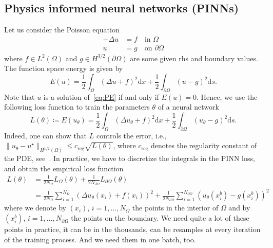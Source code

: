 \documentclass[11pt]{article}
\theoremstyle{definition}
\theoremstyle{plain}
\begin{document}
\subsection{Physics informed neural networks (PINNs)}
Let us consider the Poisson equation %
\begin{align*}\tag{PE}\label{eq:PE}
  -\Delta u & = f \quad \text{in }\Omega \\
  u & = g \quad \text{on }\partial\Omega
\end{align*}
where $f\in L^2(\Omega)$ and $g\in H^{3/2}(\partial\Omega)$ are some given rhs and boundary values.
The function space energy is given by
\[ E(u) = \frac{1}{2} \int_\Omega (\Delta u + f)^2 \mathrm dx + \frac12 \int_{\partial\Omega} (u-g)^2 \mathrm ds. \]
Note that $u$ is a solution of~\eqref{eq:PE} if and only if $E(u)=0$. Hence, we use the following loss function to train the parameters $\theta$ of a neural network
\[ L(\theta) \coloneqq E(u_\theta) = \frac{1}{2} \int_\Omega (\Delta u_\theta + f)^2 \mathrm dx + \frac12 \int_{\partial\Omega} (u_\theta-g)^2 \mathrm ds. \]
Indeed, one can show that $L$ controls the error, i.e., $\lVert u_\theta - u^\star \rVert_{H^{1/2}(\Omega)} \le c_{\operatorname{reg}} \sqrt{L(\theta)}$, where $c_{\operatorname{reg}}$ denotes the regularity constant of the PDE, see~\cite{?}. 
In practice, we have to discretize the integrals in the PINN loss, and obtain the empirical loss function %
\begin{align*}
  L(\theta)
  &=
    \frac{1}{2N_\Omega} L_\Omega(\theta) + \frac{1}{2N_{\partial\Omega}}L_{\partial\Omega}(\theta)
  \\
  &=
    \frac{1}{2N_\Omega} \sum_{i=1}^{N_\Omega} (\Delta u_\theta(x_i) + f(x_i))^2 + \frac{1}{2N_{\partial\Omega}}\sum_{i=1}^{N_{\partial\Omega}} ( u_\theta(x^b_i) - g(x^b_i))^2
\end{align*}
where we denote by $(x_i)$, $i=1,\dots,N_\Omega$ the points in the interior of $\Omega$ and by $(x^b_i)$, $i=1,\dots,N_{\partial\Omega}$ the points on the boundary.
We need quite a lot of these points in practice, it can be in the thousands, can be resamples at every iteration of the training process. 
And we need them in one batch, too. 
\end{document}
